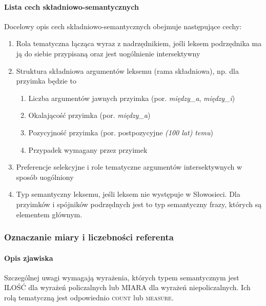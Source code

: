\documentclass[12pt]{mwart}
\theoremstyle{remark}
\begin{document}
\paragraph{Lista cech składniowo-semantycznych} %
\label{sub:cechy_ala_Walenty}

Docelowy opis cech składniowo-semantycznych obejmuje następujące cechy:

\begin{enumerate}
\item Rola tematyczna łącząca wyraz z nadrzędnikiem, jeśli leksem podrzędnika ma ją do siebie przypisaną oraz jest uogólnienie intersektywny
\item Struktura składniowa argumentów leksemu (rama składniowa), np. dla przyimka będzie to
\begin{enumerate}
\item Liczba argumentów jawnych przyimka (por. \emph{między\_a}, \emph{między\_i})
\item Okalającość przyimka (por. \emph{między\_a})
\item Pozycyjność przyimka (por. postpozycyjne  \emph{(100 lat) temu})
\item Przypadek wymagany przez przyimek
\end{enumerate}

\item Preferencje selekcyjne i role tematyczne argumentów intersektywnych w sposób uogólniony
\item Typ semantyczny leksemu, jeśli leksem nie występuje w Słowosieci. Dla przyimków i spójników podrzędnych jest to typ semantyczny frazy, których są elementem głównym.
\end{enumerate}

\subsubsection{Oznaczanie miary i liczebności referenta} %
\paragraph{Opis zjawiska} %
\label{sub:opis_zjawiska4}

Szczególnej uwagi wymagają wyrażenia, których typem semantycznym jest \textsf{ILOŚĆ} dla wyrażeń policzalnych lub \textsf{MIARA} dla wyrażeń niepoliczalnych. Ich rolą tematyczną jest odpowiednio \textsc{count} lub \textsc{measure}.
\end{document}
